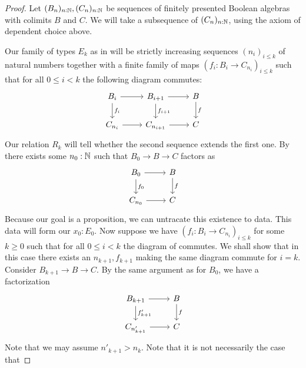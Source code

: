 \begin{proof}
  Let $(B_n)_{n:\mathbb{N}}, (C_n)_{n:\mathbb{N}}$ be 
  sequences of finitely presented Boolean algebras with colimits $B$ and $C$. 
  We will take a subsequence of $(C_n)_{n:\mathbb{N}}$, using the axiom of dependent choice above. 

  Our family of types $E_k$ as in  
  will be strictly increasing sequences $(n_i)_{i\leq k}$ of natural numbers together with a finite family of maps 
  $(f_i: B_{i} \to C_{n_i})_{i\leq k}$ such that
  for all $0\leq i<k$ the following diagram commutes:
  \begin{equation}\label{eqnDecompositionOfColimitMorphisms}
    \begin{tikzcd}
      B_{i} \arrow[r] \arrow[d, "f_i"]& B_{{i+1}} \arrow[r] \arrow[d,"f_{i+1}"]& B \arrow[d,"f"] \\
      C_{n_i} \arrow[r] & C_{n_{i+1}} \arrow[r] & C 
    \end{tikzcd}
  \end{equation}
  Our relation $R_k$ will tell whether the second sequence extends the first one. 
%
  By  
  there exists some $n_0:\mathbb{N}$ 
  such that $B_0 \to B \to C$ factors as 
  \begin{equation}
    \begin{tikzcd}
      B_{0} \arrow[r] \arrow[d, "f_0"]& B \arrow[d,"f"] \\
      C_{n_0} \arrow[r] & C 
    \end{tikzcd}
  \end{equation}
  Because our goal is a proposition, we can untracate this existence to data. 
  This data will form our $x_0:E_0$. %
%
  Now suppose we have $(f_i: B_{i} \to C_{n_i})_{i\leq k}$ for some $k\geq 0$ 
  such that
  for all $0\leq i<k$ the diagram of  commutes.
  We shall show that in this case there exists an $n_{k+1}, f_{k+1}$ 
  making the same diagram commute for $i = k$. 
  Consider $B_{{k}+1}\to B \to C$. By the same argument as for $B_0$, we have a factorization 
  \begin{equation}
    \begin{tikzcd}
    B_{k+1} \arrow[r]  \arrow[d,"f'_{k+1}"]& B \arrow[d,"f"]\\
    C_{n'_{k+1}} \arrow[r] & C
    \end{tikzcd}
  \end{equation}
  Note that we may assume $n'_{k+1} > n_k$.
  Note that it is not necessarily the case that 

\end{proof}
